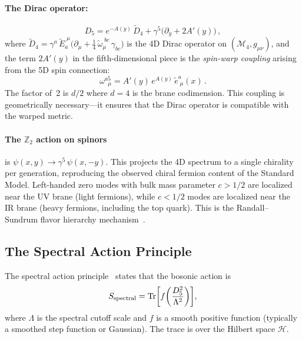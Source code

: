 \paragraph{The Dirac operator:}
\begin{equation}
\label{eq:1-dirac}
D_5 = e^{-A(y)}\, \tilde{D}_4 + \gamma^5\bigl(\partial_y + 2A'(y)\bigr)\,,
\end{equation}
where $\tilde{D}_4 = \gamma^a\, \tilde{E}_a^{\;\mu}\bigl(\partial_\mu + \tfrac{1}{4}\, \tilde{\omega}_\mu^{\;bc}\, \gamma_{bc}\bigr)$ is the 4D Dirac operator on $(\mathcal{M}_4, g_{\mu\nu})$, and the term $2A'(y)$ in the fifth-dimensional piece is the \emph{spin-warp coupling} arising from the 5D spin connection:
\begin{equation}
\label{eq:1-spin-connection}
\omega^{a5}_{\;\;\mu} = A'(y)\, e^{A(y)}\, \tilde{e}^a_{\;\mu}(x)\,.
\end{equation}
The factor of~2 is $d/2$ where $d = 4$ is the brane codimension. This coupling is geometrically necessary---it ensures that the Dirac operator is compatible with the warped metric.

\paragraph{The $\mathbb{Z}_2$ action on spinors} is $\psi(x,y) \to \gamma^5\, \psi(x,-y)$. This projects the 4D spectrum to a single chirality per generation, reproducing the observed chiral fermion content of the Standard Model. Left-handed zero modes with bulk mass parameter $c > 1/2$ are localized near the UV brane (light fermions), while $c < 1/2$ modes are localized near the IR brane (heavy fermions, including the top quark). This is the Randall--Sundrum flavor hierarchy mechanism~\cite{ch1:grossman-neubert}.

\subsection{The Spectral Action Principle}
\label{sec:1-spectral-action}

The spectral action principle~\cite{ch1:chamseddine97} states that the bosonic action is
\begin{equation}
\label{eq:1-spectral-action}
S_{\mathrm{spectral}} = \operatorname{Tr}\!\left[f\!\left(\frac{D_5^2}{\Lambda^2}\right)\right]\!,
\end{equation}
where $\Lambda$ is the spectral cutoff scale and $f$ is a smooth positive function (typically a smoothed step function or Gaussian). The trace is over the Hilbert space $\mathcal{H}$.

